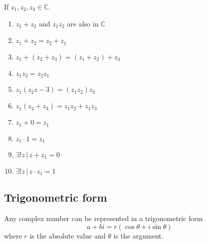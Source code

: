 \documentclass{article}
\begin{document}
If \(z_1, z_2, z_3 \in \mathbb{C}\).
\begin{enumerate}
    \item \(z_1+z_2\) and \(z_1z_2\) are also in \(\mathbb{C}\)
    \item \(z_1+z_2=z_2+z_1\)
    \item \(z_1 + (z_2 + z_3) = (z_1 + z_2) + z_3\)
    \item \(z_1z_2=z_2z_1\)
    \item \(z_1(z_2z-3)=(z_1z_2)z_3\)
    \item \(z_1(z_2+z_3)=z_1z_2+z_1z_3\)
    \item \(z_1+0=z_1\)
    \item \(z_1\cdot 1=z_1\)
    \item \(\exists ! z \,|\, z+z_1=0\)
    \item \(\exists ! z \,|\, z\cdot z_1=1\)
\end{enumerate}

\subsection{Trigonometric form}

Any complex number can be represented in a trigonometric form
\[
    a+bi=r(\cos\theta+i\sin\theta)
\]
where \(r\) is the absolute value and \(\theta\) is the argument.

\pagebreak
\end{document}
